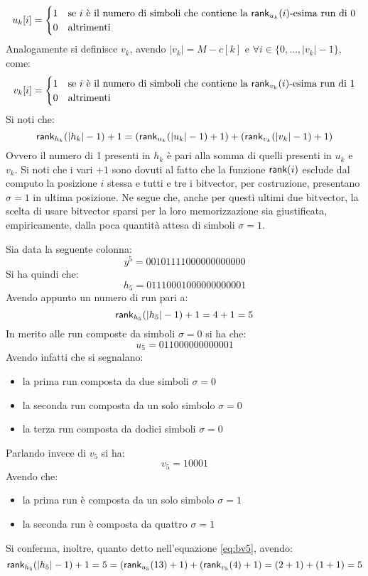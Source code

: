 \begin{equation}
  \label{eq:bv3}
  u_k[i]=
  \begin{cases}
    1&\mbox{se }i \mbox{ è il numero di simboli che contiene la
    }\mbox{\rm {\sf rank}}_{u_k}(i)\mbox{-esima run di 0}\\
    0&\mbox{altrimenti}
  \end{cases}
\end{equation}
Analogamente si definisce $v_k$, avendo $|v_k|=M-c[k]$ e $\forall
i\in\{0,\ldots,|v_k|-1\}$, come: 
\begin{equation}
  \label{eq:bv4}
  v_k[i]=
  \begin{cases}
    1&\mbox{se }i \mbox{ è il numero di simboli che contiene la
    }\mbox{\rm {\sf rank}}_{v_k}(i)\mbox{-esima run di 1}\\
    0&\mbox{altrimenti}
  \end{cases}
\end{equation}
Si noti che:
\begin{equation}
  \label{eq:bv5}
  \mbox{\rm {\sf rank}}_{h_k}(|h_k|-1)+1=(\mbox{\rm {\sf rank}}_{u_k}(|u_k|-1)+1)+(\mbox{\rm {\sf rank}}_{v_k}(|v_k|-1)+1)
\end{equation}
Ovvero il numero di 1 presenti in $h_k$ è pari alla somma di quelli presenti in
$u_k$ e $v_k$. Si noti che i vari $+1$ sono
dovuti al fatto che la funzione 
$\mbox{\rm {\sf rank}}(i)$ esclude dal computo la posizione $i$ stessa e tutti e tre i
bitvector, 
per costruzione, presentano $\sigma=1$ in ultima posizione. Ne segue che, anche
per questi ultimi due bitvector, la scelta di 
usare bitvector sparsi per la loro memorizzazione sia giustificata,
empiricamente, dalla poca quantità attesa di simboli $\sigma=1$.
\begin{esempio}
  \label{es:bv1}
  Sia data la seguente colonna:
  \[y^5=00101111000000000000\]
  Si ha quindi che:
  \[h_5=01110001000000000001\]
  Avendo appunto un numero di run pari a:
  \[\mbox{\rm {\sf rank}}_{h_5}(|h_5|-1)+1=4+1=5\]
  In merito alle run composte da simboli $\sigma=0$ si ha che:
  \[u_5=011000000000001\]
  Avendo infatti che si segnalano:
  \begin{itemize}
    \item la prima run composta da due simboli $\sigma=0$
    \item la seconda run composta da un solo simbolo $\sigma=0$
    \item la terza run composta da dodici simboli $\sigma=0$
  \end{itemize}
  Parlando invece di $v_5$ si ha:
  \[v_5=10001\]
  Avendo che:
  \begin{itemize}
    \item la prima run è composta da un solo simbolo $\sigma=1$
    \item la seconda run è composta da quattro $\sigma=1$
  \end{itemize}
  Si conferma, inoltre, quanto detto nell'equazione \ref{eq:bv5}, avendo:
  \[\mbox{\rm {\sf rank}}_{h_5}(|h_5|-1)+1=5 =
    (\mbox{\rm {\sf rank}}_{u_5}(13)+1)+(\mbox{\rm {\sf rank}}_{v_5}(4)+1)=(2+1)+(1+1)=5\] 
\end{esempio}
